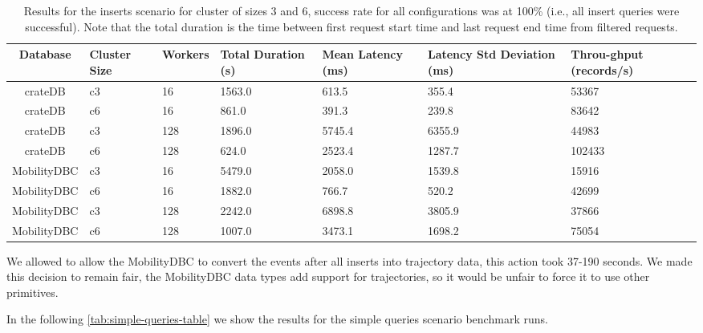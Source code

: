 \begin{table}[ht]
  \centering
  \begin{tabularx}{\textwidth}{|c|Y|Y|Y|Y|Y|Y|}
    \hline
    Database & Cluster Size&  Workers  &Total Duration (s) &Mean Latency (ms) & Latency Std Deviation (ms) & Throu-ghput (records/s) \\
    \hline
    crateDB           &c3       &16             &1563.0              &613.5              &355.4                  &53367\\
    crateDB           &c6       &16              &861.0              &391.3              &239.8                  &83642\\
    crateDB           &c3      &128             &1896.0             &5745.4             &6355.9                  &44983\\
    crateDB           &c6      &128              &624.0             &2523.4             &1287.7                 &102433\\
    \hline
    MobilityDBC           &c3       &16             &5479.0             &2058.0             &1539.8                  &15916\\
    MobilityDBC           &c6       &16             &1882.0              &766.7              &520.2                  &42699\\
    MobilityDBC           &c3      &128             &2242.0             &6898.8             &3805.9                  &37866\\
    MobilityDBC           &c6      &128             &1007.0             &3473.1             &1698.2                  &75054\\
    \hline
  \end{tabularx}
  \caption{Results for the inserts scenario for cluster of sizes 3 and 6, success rate for all configurations was at 100\% (i.e., all insert queries were successful).
    Note that the total duration is the time between first request start time and last request end time from filtered requests.
  }
  \label{tab:inserts-table}
\end{table}

We allowed to allow the MobilityDBC to convert the events after all inserts into trajectory data, this action took 37-190 seconds.
We made this decision to remain fair, the MobilityDBC data types add support for trajectories, so it would be unfair to force it to use other primitives.

In the following \cref{tab:simple-queries-table} we show the results for the simple queries scenario benchmark runs.

